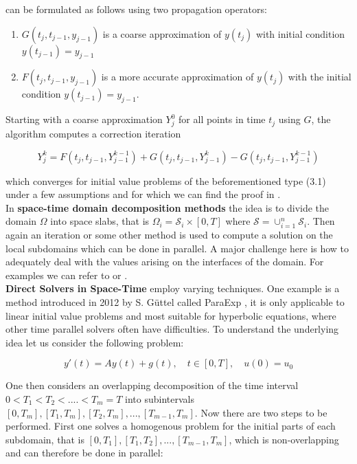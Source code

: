 \documentclass[../draft_1.tex]{subfiles}
\begin{document}
can be formulated as follows using two propagation operators:
\begin{enumerate}
	\item $G(t_j, t_{j-1}, y_{j-1})$ is a coarse approximation of $y(t_j)$ with initial condition $y(t_{j-1}) = y_{j-1} $
	\item $F(t_j, t_{j-1}, y_{j-1})$ is a more accurate approximation of $y(t_j)$ with the initial condition $y(t_{j-1}) = y_{j-1}$.
\end{enumerate}
Starting with a coarse approximation $Y_j^0$ for all points in time $t_j$ using $G$, the algorithm computes a correction iteration 
\begin{ceqn}
	\begin{equation}
	Y_{j}^{k} = F(t_j, t_{j-1}, Y_{j-1}^{k-1}) + G(t_j, t_{j-1}, Y_{j-1}^{k}) - G(t_j, t_{j-1}, Y_{j-1}^{k-1})
	\end{equation}
\end{ceqn}
which converges for initial value problems of the beforementioned type (3.1) under a few assumptions and for which we can find the proof in \cite{gander2008nonlinear}.
\smallskip
\\
In \textbf{space-time domain decomposition methods} the idea is to divide the domain $\Omega$ into space slabs, that is $\Omega_i = \mathcal{S}_i \times [0,T]$ where $\mathcal{S} = \cup_{i=1}^n \mathcal{S}_i$. Then again an iteration or some other method is used to compute a solution on the local subdomains which can be done in parallel. A major challenge here is how to adequately deal with the values arising on the interfaces of the domain. For examples we can refer to \cite{gander1996overlapping} or \cite{gander1999optimal}.
\smallskip
\\
\textbf{Direct Solvers in Space-Time} employ varying techniques. One example is a method introduced in 2012 by S. G\"uttel called ParaExp \cite{guttel2013parallel}, it is only applicable to linear initial value problems and most suitable for hyperbolic equations, where other time parallel solvers often have difficulties. To understand the underlying idea let us consider the following problem:
\begin{ceqn}
	\begin{equation}
	y'(t) = Ay(t) + g(t), \quad t \in [0,T], \quad u(0) = u_0
	\end{equation}
\end{ceqn}
One then considers an overlapping decomposition of the time interval $0 < T_1 < T_2 < .... < T_m = T$ into subintervals $[0, T_m], [T_1, T_m], [T_2, T_m], ..., [T_{m-1}, T_m]$. Now there are two steps to be performed. First one solves a homogenous problem for the initial parts of each subdomain, that is $[0,T_1], [T_1, T_2], ... , [T_{m-1}, T_m]$, which is non-overlapping and can therefore be done in parallel:
\end{document}
